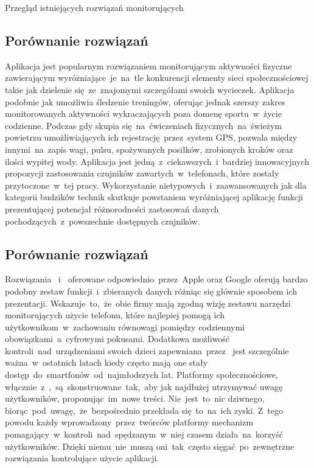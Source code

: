 \begin{chapter}{Przegląd istniejących rozwiązań monitorujących}
	\subsection{Porównanie rozwiązań}
	Aplikacja  jest popularnym rozwiązaniem monitorującym aktywności fizyczne zawierającym wyróżniające~je~na~tle konkurencji elementy sieci społecznościowej takie jak dzielenie się~ze~znajomymi szczegółami swoich wycieczek. Aplikacja  podobnie jak  umożliwia śledzenie treningów, oferując jednak szerszy zakres monitorowanych aktywności wykraczających poza domenę sportu~w~życie codzienne. Podczas gdy  skupia się~na~ćwiczeniach fizycznych~na~świeżym powietrzu umożliwiających ich rejestrację~przez~system GPS,  pozwala między innymi~na~zapis wagi, pulsu, spożywanych posiłków, zrobionych kroków oraz ilości wypitej wody. Aplikacja  jest jedną~z~ciekawszych~i~bardziej innowacyjnych propozycji zastosowania czujników zawartych~w~telefonach, które zostały przytoczone~w~tej pracy.  Wykorzystanie nietypowych~i~zaawansowanych jak dla kategorii budzików technik skutkuje powstaniem wyróżniającej aplikację funkcji prezentującej potencjał różnorodności zastosowań danych pochodzących~z~powszechnie dostępnych czujników.
	
	
	
	\subsection{Porównanie rozwiązań}
	Rozwiązania ~i~ oferowane odpowiednio~przez~Apple oraz Google oferują bardzo podobny zestaw funkcji~i~zbieranych danych różniąc się głównie sposobem ich prezentacji. Wskazuje~to,~że~obie firmy mają zgodną wizję zestawu narzędzi monitorujących użycie telefonu, które najlepiej pomogą ich użytkownikom~w~zachowaniu równowagi pomiędzy codziennymi obowiązkami~a~cyfrowymi pokusami. Dodatkowa możliwość kontroli~nad~urządzeniami swoich dzieci zapewniana~przez~ jest szczególnie ważna~w~ostatnich latach kiedy często mają one stały dostęp~do~smartfonów~od~najmłodszych lat. Platformy społecznościowe, włącznie~z~,~są~skonstruowane~tak,~aby jak najdłużej utrzymywać uwagę użytkowników, proponując~im~nowe treści. Nie~jest~to~nic dziwnego, biorąc~pod~uwagę,~że~bezpośrednio przekłada się~to~na~ich zyski. Z~tego powodu każdy wprowadzony~przez~twórców platformy  mechanizm pomagający~w~kontroli~nad~spędzanym~w~niej czasem działa~na~korzyść użytkowników. Dzięki niemu~nie~muszą oni~tak~często sięgać~po~zewnętrzne rozwiązania kontrolujące użycie aplikacji.
	
	
\end{chapter}
